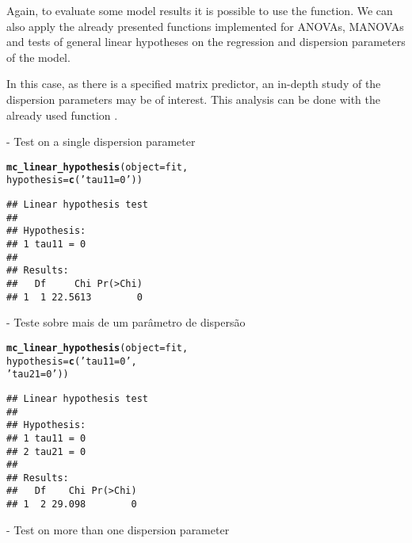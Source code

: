 \documentclass[article]{jss}\usepackage[]{graphicx}\usepackage[]{xcolor}
\makeatletter
\newcommand{\hlstr}[1]{\textcolor[rgb]{0.192,0.494,0.8}{#1}}%
\newcommand{\hlstd}[1]{\textcolor[rgb]{0.345,0.345,0.345}{#1}}%
\newcommand{\hlkwc}[1]{\textcolor[rgb]{0.333,0.667,0.333}{#1}}%
\newcommand{\hlkwd}[1]{\textcolor[rgb]{0.737,0.353,0.396}{\textbf{#1}}}%
\newenvironment{kframe}{%
 \def\at@end@of@kframe{}%
 \ifinner\ifhmode%
  \def\at@end@of@kframe{\end{minipage}}%
  \begin{minipage}{\columnwidth}%
 \fi\fi%
 \def\FrameCommand##1{\hskip\@totalleftmargin \hskip-\fboxsep
 \colorbox{shadecolor}{##1}\hskip-\fboxsep
     \hskip-\linewidth \hskip-\@totalleftmargin \hskip\columnwidth}%
 \MakeFramed {\advance\hsize-\width
   \@totalleftmargin\z@ \linewidth\hsize
   \@setminipage}}%
 {\par\unskip\endMakeFramed%
 \at@end@of@kframe}
\newenvironment{knitrout}{}{} %
\makeatother
\begin{document}
Again, to evaluate some model results it is possible to use the  function. We can also apply the already presented functions implemented for ANOVAs, MANOVAs and tests of general linear hypotheses on the regression and dispersion parameters of the model.

In this case, as there is a specified matrix predictor, an in-depth study of the dispersion parameters may be of interest. This analysis can be done with the already used function .

 - Test on a single dispersion parameter

\begin{knitrout}
\color{fgcolor}\begin{kframe}
\begin{alltt}
\hlkwd{mc_linear_hypothesis}\hlstd{(}\hlkwc{object} \hlstd{=  fit,}
                     \hlkwc{hypothesis} \hlstd{=} \hlkwd{c}\hlstd{(}\hlstr{'tau11 = 0'}\hlstd{))}
\end{alltt}
\begin{verbatim}
## Linear hypothesis test
## 
## Hypothesis:           
## 1 tau11 = 0
## 
## Results:
##   Df     Chi Pr(>Chi)
## 1  1 22.5613        0
\end{verbatim}
\end{kframe}
\end{knitrout}

 - Teste sobre mais de um parâmetro de dispersão

\begin{knitrout}
\color{fgcolor}\begin{kframe}
\begin{alltt}
\hlkwd{mc_linear_hypothesis}\hlstd{(}\hlkwc{object} \hlstd{=  fit,}
                     \hlkwc{hypothesis} \hlstd{=} \hlkwd{c}\hlstd{(}\hlstr{'tau11 = 0'}\hlstd{,}
                                    \hlstr{'tau21 = 0'}\hlstd{))}
\end{alltt}
\begin{verbatim}
## Linear hypothesis test
## 
## Hypothesis:           
## 1 tau11 = 0
## 2 tau21 = 0
## 
## Results:
##   Df    Chi Pr(>Chi)
## 1  2 29.098        0
\end{verbatim}
\end{kframe}
\end{knitrout}

 - Test on more than one dispersion parameter
\end{document}
